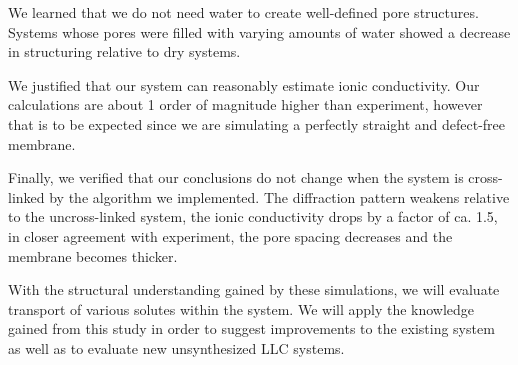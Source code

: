 \documentclass[journal=jpcbfk,manusciprt=article]{achemso}
\begin{document}
  We learned that we do not need water to create well-defined pore structures.
  Systems whose pores were filled with varying amounts of water showed a decrease
  in structuring relative to dry systems. 

  We justified that our system can reasonably estimate ionic conductivity.  Our
  calculations are about 1 order of magnitude higher than experiment, however
  that is to be expected since we are simulating a perfectly straight and
  defect-free membrane. 

  Finally, we verified that our conclusions do not change when the system is
  cross-linked by the algorithm we implemented. The diffraction pattern weakens
  relative to the uncross-linked system, the ionic conductivity drops by a factor
  of ca. 1.5, in closer agreement with experiment, the pore spacing decreases and
  the membrane becomes thicker. 

  With the structural understanding gained by these simulations, we will
  evaluate transport of various solutes within the system. We will apply the
  knowledge gained from this study in order to suggest improvements to the
  existing system as well as to evaluate new unsynthesized LLC systems.

  \clearpage
  
\end{document}
